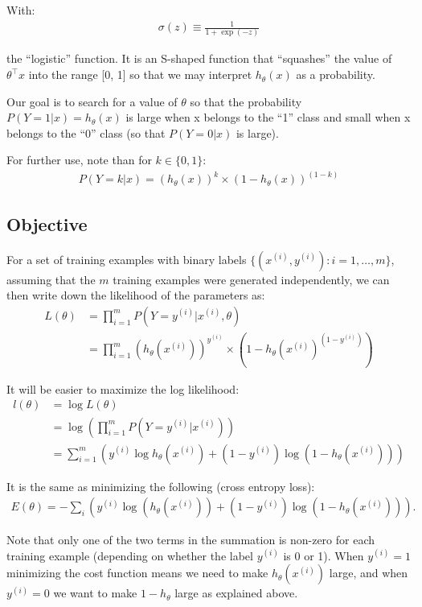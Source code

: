With:
\begin{align}
	\sigma(z) \equiv \frac{1}{1 + \exp(-z)}
\end{align}

the “logistic” function. It is an S-shaped function that “squashes” the value of $\theta^\top x$ into the range [0, 1] so that we may interpret $h_\theta(x)$ as a probability. 

Our goal is to search for a value of $\theta$ so that the probability $P(Y=1|x) = h_\theta(x)$ is large when x belongs to the “1” class and small when x belongs to the “0” class (so that $P(Y=0|x)$ is large). 

For further use, note than for $k \in \{0,1\}$:
\begin{align}
	P(Y=k|x) = (h_\theta(x))^k \times (1 - h_\theta(x))^{(1-k)}
\end{align}

\subsection{Objective}
For a set of training examples with binary labels $\{ (x^{(i)}, y^{(i)}) : i=1,\ldots,m\}$, assuming that the $m$ training examples were generated independently, we can then write down the likelihood of the parameters as:
\begin{align}
	L(\theta) &= \prod_{i=1}^m P(Y=y^{(i)} | x^{(i)}, \theta) \\
			  &= \prod_{i=1}^m (h_\theta(x^{(i)}))^{y^{(i)}} \times (1 - h_\theta(x^{(i)})^{(1-y^{(i)})})
\end{align}

It will be easier to maximize the log likelihood:
\begin{align}
	l(\theta) &= \log L(\theta) \\
			  &= \log \left( \prod_{i=1}^m P(Y=y^{(i)} | x^{(i)}) \right) \\
			  &= \sum_{i=1}^m \left( y^{(i)}\log h_\theta(x^{(i)}) + (1-y^{(i)})\log (1 - h_\theta(x^{(i)})) \right)
\end{align}

It is the same as minimizing the following (cross entropy loss):
\begin{align}
	E(\theta) = - \sum_i \left(y^{(i)} \log( h_\theta(x^{(i)}) ) + (1 - y^{(i)}) \log( 1 - h_\theta(x^{(i)}) ) \right).
\end{align}


Note that only one of the two terms in the summation is non-zero for each training example (depending on whether the label $y^{(i)}$ is 0 or 1). When $y^{(i)} = 1$ minimizing the cost function means we need to make $h_\theta(x^{(i)})$ large, and when $y^{(i)} = 0$ we want to make $1 - h_\theta$ large as explained above.

